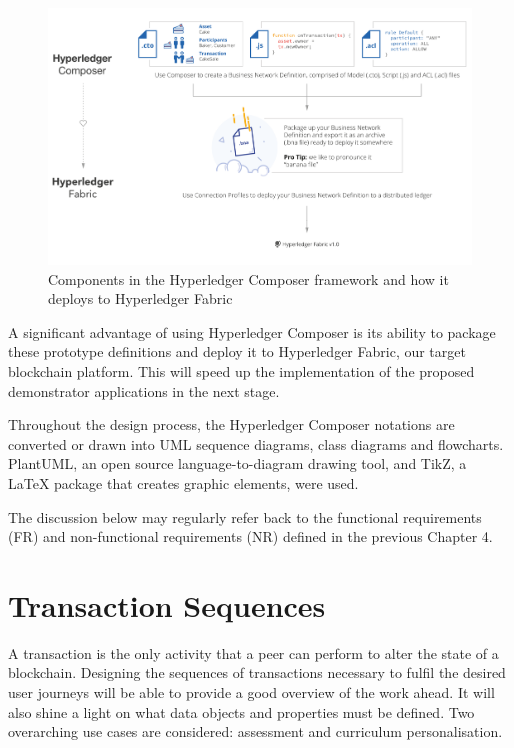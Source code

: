 \begin{figure}[!ht]
	\centering
	\includegraphics[width=1.0\textwidth]{composer2fabric}
	\caption[Hyperledger Composer]
	{Components in the Hyperledger Composer framework and how it deploys to
		Hyperledger Fabric \citep{cuicapuza2017composer}}
	\label{fig:composer2fabric}
\end{figure}

A significant advantage of using Hyperledger Composer is its ability to package these
prototype definitions and deploy it to Hyperledger Fabric, our target blockchain platform.
This will speed up the implementation of the proposed demonstrator applications
in the next stage.

Throughout the design process, the Hyperledger Composer notations are converted or drawn into UML sequence
diagrams, class diagrams and flowcharts. PlantUML, an open source language-to-diagram drawing tool,
and TikZ, a LaTeX package that creates graphic elements, were used.

The discussion below may regularly refer back to the functional requirements (FR) and
non-functional requirements (NR) defined in the previous Chapter 4.

\section{Transaction Sequences}

A transaction is the only activity that a peer can perform to alter the state of a blockchain.
Designing the sequences of transactions necessary to fulfil the desired user journeys will
be able to provide a good overview of the work ahead. It will also shine a light on
what data objects and properties must be defined. Two overarching use cases are considered:
assessment and curriculum personalisation.


